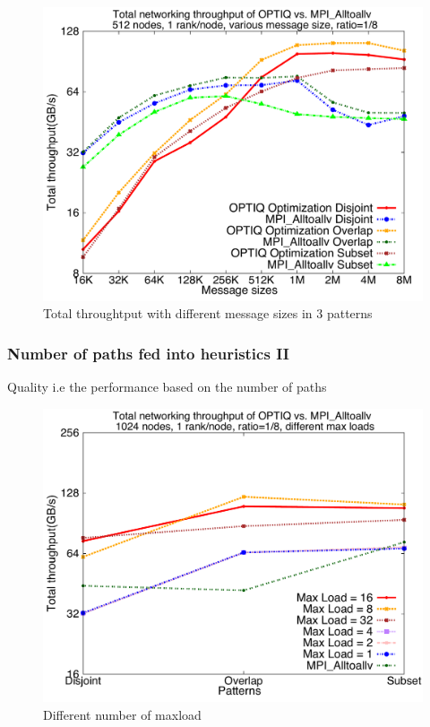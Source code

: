 \begin{figure}[!htb]
\vspace{-0.1in}
\centering
\includegraphics[scale=0.30]{figures/messagesize.pdf}
\vspace{-0.1in}
\caption{Total throughtput with different message sizes in 3 patterns}
\vspace{-0.1in}
\label{fig:messagesize}
\end{figure}

\subsubsection{Number of paths fed into heuristics II}

Quality i.e the performance based on the number of paths

\begin{figure}[!htb]
\vspace{-0.1in}
\centering
\includegraphics[scale=0.30]{figures/heu_paths_3p.pdf}
\vspace{-0.1in}
\caption{Different number of maxload}
\vspace{-0.1in}
\label{fig:heu_paths_3p}
\end{figure}


